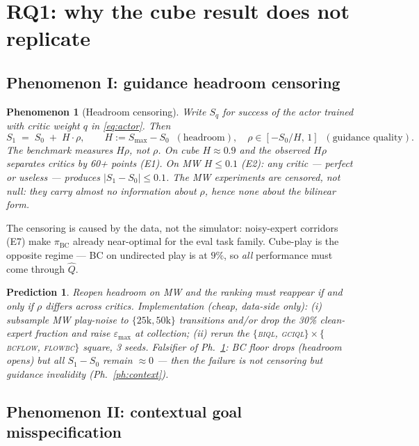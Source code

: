 \documentclass[10pt]{article}
\newtheorem{phenomenon}{Phenomenon}
\newtheorem{prediction}{Prediction}
\begin{document}
\section{RQ1: why the cube result does not replicate}

\subsection{Phenomenon I: guidance headroom censoring}

\begin{phenomenon}[Headroom censoring]\label{ph:headroom}
Write $S_q$ for success of the actor trained with critic weight $q$ in \eqref{eq:actor}.
Then
\begin{equation}
S_1 \;=\; S_0 \;+\; H\cdot \rho, \qquad
H := S_{\max}-S_0 \;\;(\text{headroom}), \quad \rho\in[-S_0/H,\,1]\;\;(\text{guidance quality}).
\end{equation}
The benchmark \emph{measures} $H\rho$, not $\rho$. On cube $H\approx0.9$ and the observed
$H\rho$ separates critics by 60+ points (E1). On MW $H\le0.1$ (E2): \emph{any} critic ---
perfect or useless --- produces $|S_1-S_0|\le 0.1$. The MW experiments are censored, not
null: they carry almost no information about $\rho$, hence none about the bilinear form.
\end{phenomenon}

The censoring is caused by the data, not the simulator: noisy-expert corridors (E7) make
$\pi_{\mathrm{BC}}$ already near-optimal for the eval task family. Cube-play is the opposite
regime --- BC on undirected play is at $9\%$, so \emph{all} performance must come through
$\hat Q$.

\begin{prediction}\label{pred:headroom}
Reopen headroom on MW and the ranking must reappear if and only if $\rho$ differs across
critics. Implementation (cheap, data-side only): (i) subsample MW play-noise to
$\{25\mathrm{k}, 50\mathrm{k}\}$ transitions and/or drop the 30\% clean-expert fraction and
raise $\varepsilon_{\max}$ at collection; (ii) rerun the $\{$\textsc{biql},
\textsc{gciql}$\}\times\{$\textsc{bcflow}, \textsc{flowbc}$\}$ square, 3 seeds. Falsifier of
Ph.~\ref{ph:headroom}: BC floor drops (headroom opens) but all $S_1-S_0$ remain $\approx0$
--- then the failure is not censoring but guidance invalidity (Ph.~\ref{ph:context}).
\end{prediction}

\subsection{Phenomenon II: contextual goal misspecification}
\end{document}
